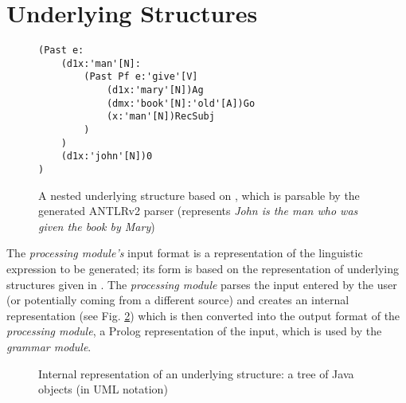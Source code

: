 \documentclass[a4paper, halfparskip, onecolumn, abstractoff, final]{scrartcl}
\begin{document}


\section{Underlying Structures}

\begin{figure}
\begin{center}
\begin{verbatim}
(Past e:
    (d1x:'man'[N]:
        (Past Pf e:'give'[V]
            (d1x:'mary'[N])Ag  
            (dmx:'book'[N]:'old'[A])Go
            (x:'man'[N])RecSubj
        )
    )
    (d1x:'john'[N])0
)
\end{verbatim}
\caption{A nested underlying structure based on \cite{Dik1997a}, which is parsable by the generated ANTLRv2 parser (represents \emph{John is the man who was given the book by Mary})}\label{antlr-input}
\end{center}
\end{figure}

The \emph{processing module's} input format is a representation of the linguistic expression to be generated; its form is based on the representation of underlying structures given in \cite{Dik1997a}. The \emph{processing module} parses the input entered by the user (or potentially coming from a different source) and creates an internal representation (see Fig. \ref{uml-tree}) which is then converted into the output format of the \emph{processing module}, a Prolog representation of the input, which is used by the \emph{grammar module}.

\begin{figure}
\begin{center}
\mbox{}
\caption{Internal representation of an underlying structure: a tree of Java objects (in UML notation)}
\label{uml-tree}
\end{center}
\end{figure}
    
\end{document}
